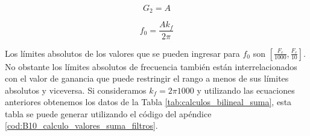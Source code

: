 	\begin{equation}
		G_{2} = A
	\end{equation}
	
	\begin{equation}
		f_{0} = \frac{A k_{f}}{2 \pi}
	\end{equation}
	
	Los límites absolutos de los valores que se pueden ingresar para $f_{0}$ son $[\frac{F_{c}}{1000}, \frac{F_{c}}{10}]$. No obstante los límites absolutos de frecuencia también están interrelacionados con el valor de ganancia que puede restringir el rango a menos de sus límites absolutos y viceversa. Si consideramos $k_{f} = 2 \pi 1000$ y utilizando las ecuaciones anteriores obtenemos los datos de la Tabla \ref{tab:calculos_bilineal_suma}, esta tabla se puede generar utilizando el código del apéndice \ref{cod:B10_calculo_valores_suma_filtros}.

